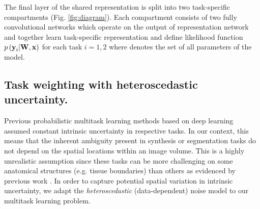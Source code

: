 The final layer of the shared representation is split into two task-specific compartments (Fig. \ref{fig:diagram}). Each compartment consists of two fully convolutional networks which operate on the output of representation network and together learn task-specific representation and define likelihood function $p\left(\text{\textbf{y}}_{i}|\text{\textbf{W}},\textbf{x}\right)$ for each task $i=1, 2$ where  denotes the set of all parameters of the model. 

\subsection{Task weighting with heteroscedastic uncertainty.}
Previous probabilistic multitask learning methods based on deep learning \cite{kendall2017multi} assumed constant intrinsic uncertainty in respective tasks. In our context, this means that the inherent ambiguity present in synthesis or segmentation tasks do not depend on the spatial locations within an image volume. This is a highly unrealistic assumption since these tasks can be more challenging on some anatomical structures (e.g. tissue boundaries) than others as evidenced by previous work \cite{asman2011robust}. In order to capture potential spatial variation in intrinsic uncertainty, we adapt the \emph{heteroscedastic} (data-dependent) noise model to our multitask learning problem.   

